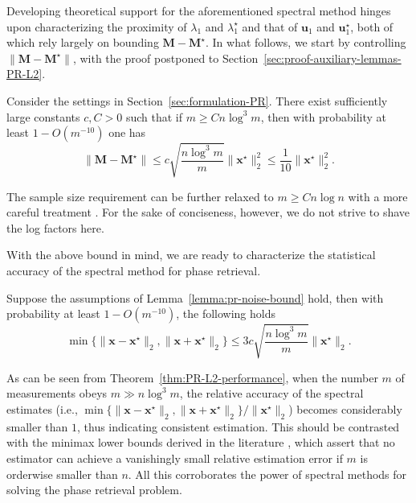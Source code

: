 Developing theoretical support for the aforementioned spectral method hinges upon characterizing the proximity of $\lambda_{1}$ and $\lambda_{1}^{\star}$
and that of $\bm{u}_{1}$ and $\bm{u}_{1}^{\star}$, both of which rely largely on bounding $\bm{M}-\bm{M}^{\star}$.
In what follows, we start by controlling  $\|\bm{M}-\bm{M}^{\star}\|$, with the proof  postponed to Section~\ref{sec:proof-auxiliary-lemmas-PR-L2}.
%
\begin{lemma}
\label{lemma:pr-noise-bound}
Consider the settings in Section~\ref{sec:formulation-PR}.
There exist  sufficiently large constants $c,C>0$ such that if $m\geq Cn\log^{3}m$, then with probability at least $1-O(m^{-10})$ one has
%
\begin{equation}
	\|\bm{M}-\bm{M}^{\star}\|\leq c\sqrt{\frac{n\log^{3}m}{m}}\|\bm{x}^{\star}\|_{2}^{2} \leq\frac{1}{10}\|\bm{x}^{\star}\|_{2}^{2}.
	\label{eq:pr-noise-bound}
\end{equation}
%
\end{lemma}
%
\begin{remark}
	The sample size requirement can be further relaxed to $m\geq Cn\log n$ with a more careful treatment \citep{candes2015phase,ma2017implicit}.
	For the sake of conciseness, however, we do not strive to shave the log factors here.
\end{remark}
%

With the above bound in mind, we are ready to characterize the statistical accuracy of the spectral method for phase retrieval.




\begin{theorem}
\label{thm:PR-L2-performance}
Suppose the assumptions of Lemma~\ref{lemma:pr-noise-bound} hold, then with probability at least $1-O(m^{-10})$, the following holds
\[
	\min \{ \| \bm{x} - \bm{x}^{\star}\|_2, \| \bm{x} + \bm{x}^{\star}\|_2 \} \leq3c\sqrt{\frac{n\log^3 m}{m}}\|\bm{x}^{\star}\|_{2} .
\]
\end{theorem}


As can be seen from Theorem~\ref{thm:PR-L2-performance}, when the number $m$ of measurements obeys $m\gg n\log^{3}m$, the relative accuracy of the spectral estimates (i.e., $\min \{ \| \bm{x} - \bm{x}^{\star}\|_2, \| \bm{x} + \bm{x}^{\star}\|_2 \}  / \|\bm{x}^{\star}\|_{2}$) becomes considerably smaller than $1$, thus indicating consistent estimation. This should be contrasted with the minimax lower bounds derived in the literature \citep{cai2015rop,eldar2014phase}, which assert that no estimator can achieve a vanishingly small relative estimation error if $m$ is orderwise smaller than $n$. All this corroborates the power of spectral methods for solving the phase retrieval problem.



